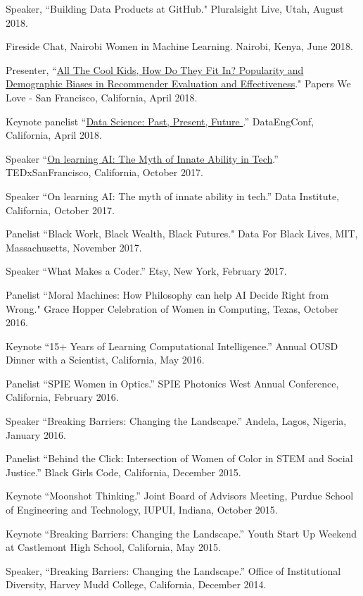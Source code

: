\documentclass[11pt,article,oneside]{memoir}
\begin{document}
\ind Speaker, ``Building Data Products at GitHub." Pluralsight Live, Utah, August 2018.

\ind Fireside Chat, Nairobi Women in Machine Learning. Nairobi, Kenya, June 2018.

\ind Presenter, ``\href{http://proceedings.mlr.press/v81/ekstrand18b/ekstrand18b.pdf}{All The Cool Kids, How Do They Fit In? Popularity and Demographic Biases in Recommender Evaluation and Effectiveness}." Papers We Love - San Francisco, California, April 2018. 

\ind Keynote panelist ``\href{https://youtu.be/_F534KBWFJc}{Data Science: Past, Present, Future }.'' DataEngConf, California, April 2018.

\ind Speaker ``\href{https://youtu.be/BFWVHSeakkg}{On learning AI: The Myth of Innate Ability in Tech}.'' TEDxSanFrancisco, California, October 2017.

\ind Speaker ``On learning AI: The myth of innate ability in tech.'' Data Institute, California, October 2017.

\ind Panelist ``Black Work, Black Wealth, Black Futures." Data For Black Lives, MIT, Massachusetts, November 2017.

\ind Speaker ``What Makes a Coder.'' Etsy, New York, February 2017.

\ind Panelist ``Moral Machines: How Philosophy can help AI Decide Right from Wrong." Grace Hopper Celebration of Women in Computing, Texas, October 2016.

\ind Keynote ``15+ Years of Learning Computational Intelligence.'' Annual OUSD Dinner with a Scientist, California, May 2016.

\ind Panelist ``SPIE Women in Optics.'' SPIE Photonics West Annual Conference, California, February 2016.

\ind Speaker ``Breaking Barriers: Changing the Landscape.'' Andela, Lagos, Nigeria, January 2016.

\ind Panelist ``Behind the Click: Intersection of Women of Color in STEM and Social Justice.'' Black Girls Code, California, December 2015.

\ind Keynote ``Moonshot Thinking.'' Joint Board of Advisors Meeting, Purdue School of Engineering and Technology, IUPUI, Indiana, October 2015.

\ind Keynote ``Breaking Barriers: Changing the Landscape.'' Youth Start Up Weekend at Castlemont High School, California, May 2015.

\ind Speaker, ``Breaking Barriers: Changing the Landscape.'' Office of Institutional Diversity, Harvey Mudd College, California, December 2014.
\end{document}
